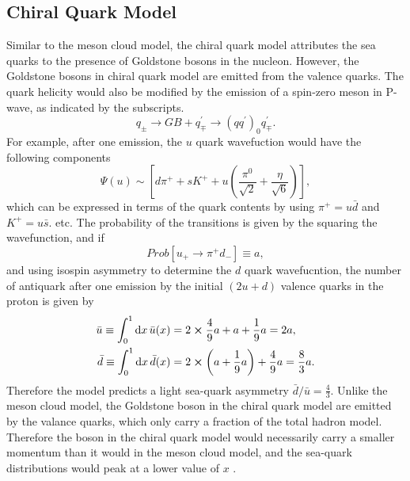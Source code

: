 \documentclass[../main.tex]{subfiles}
\begin{document}
\subsection{Chiral Quark Model}
Similar to the meson cloud model, the chiral quark model \cite{li1998} attributes the sea quarks to
the presence of Goldstone bosons in the nucleon. However, the Goldstone bosons in chiral quark model
are emitted from the valence quarks. The quark helicity would also be modified by the emission of a
spin-zero meson in P-wave, as indicated by the subscripts.
\begin{equation}
	q_{\pm} \rightarrow GB + q^\prime_\mp \rightarrow \left(q q^\prime\right)_0 q_{\mp}^\prime.
\end{equation}
For example, after one emission, the $u$ quark wavefuction would have the following components
\begin{equation}
	\Psi\left(u\right) \sim \left[d\pi^+ + s K^+ + u \left(\frac{\pi^0}{\sqrt{2}} + \frac{\eta}{\sqrt{6}}\right)\right],
\end{equation}
which can be expressed in terms of the quark contents by using $\pi^+ = u\bar{d}$ and $K^+ = u\bar{s}$. etc.
The probability of the transitions is given by the squaring the wavefunction, and if
\begin{equation}
	Prob\left[ u_+ \rightarrow \pi^+d_-\right] \equiv a,
\end{equation}
and using isospin asymmetry to determine the $d$ quark wavefucntion, the number of antiquark after one emission
by the initial $(2u+d)$ valence quarks in the proton is given by
\begin{equation}
	\begin{aligned}
		\bar{u} \equiv \int^1_0 \dd{x}\bar{u}(x) & = 2\cross\frac{4}{9}a +a+\frac{1}{9}a = 2a,                         \\
		\bar{d} \equiv \int^1_0 \dd{x}\bar{d}(x) & = 2\cross\left(a+\frac{1}{9}a\right) + \frac{4}{9}a = \frac{8}{3}a.
	\end{aligned}
\end{equation}
Therefore the model predicts a light sea-quark asymmetry $\bar{d}/\bar{u} =\frac{4}{3} $.
Unlike the meson cloud model, the Goldstone boson in the chiral quark model are emitted
by the valance quarks, which only carry a fraction of the total hadron model.
Therefore the boson in the chiral quark model would necessarily carry a smaller momentum than
it would in the meson cloud model, and the sea-quark distributions would peak at a lower value of $x$ \cite{antoniszczurek1996,peng1998}.
\end{document}
